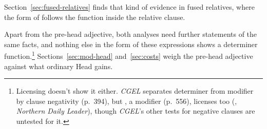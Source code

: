 Section~\ref{sec:fused-relatives} finds that kind of evidence in fused relatives, where the form of  follows the function inside the relative clause.

Apart from the pre-head adjective, both analyses need further statements of the same facts, and nothing else in the form of these expressions shows a determiner function.\footnote{Licensing  doesn't show it either. \textit{CGEL} separates determiner from modifier  by clause negativity (p.~394), but , a modifier (p.~556), licenses  too (, \textit{Northern Daily Leader}), though \textit{CGEL}'s other tests for negative clauses are untested for it.} Sections~\ref{sec:mod-head} and~\ref{sec:costs} weigh the pre-head adjective against what ordinary Head gains.
